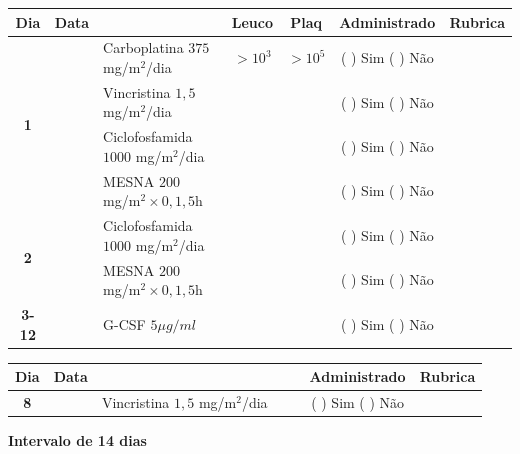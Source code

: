 \documentclass[11pt,a4paper,oldfontcommands]{memoir}
\begin{document}
\begin{center}
\begin{longtable}{p{1cm}c|p{5cm}|p{1.5cm}p{1.5cm}|c|c}
	\hline
	\multicolumn{1}{c|}{\multirow{1}{*}{\textbf{Dia}}}&{Data}&{}&\multicolumn{1}{c|}{Leuco}&\multicolumn{1}{c|}{Plaq}&{Administrado}&{Rubrica} \\
    \hline
    \multicolumn{1}{c|}{\multirow{4}{*}{\textbf{1}}}&\multirow{2}{*}{}&{Carboplatina 3\(75\) mg/m\(^2\)/dia}&\multicolumn{1}{c|}{\(>10^3\)}&\multicolumn{1}{c|}{\(>10^5\)}&{(  ) Sim (  ) Não}&\\
    \cline{4-5}
    \multicolumn{1}{c|}{}&&{Vincristina \(1,5\) mg/m\(^2\)/dia}&\multicolumn{1}{c|}{}&&{(  ) Sim (  ) Não}&\\
    \cline{4-5}
    \multicolumn{1}{c|}{}&\multirow{1}{*}{}&{Ciclofosfamida \(1000\) mg/m\(^2\)/dia}&{}&&{(  ) Sim (  ) Não}&\\
    \multicolumn{1}{c|}{}&&{MESNA \(200\) mg/m\(^2 \times 0,1,5\)h}&&&{(  ) Sim (  ) Não}&\\
    \cline{2-3}\cline{6-6}
    \multicolumn{1}{c|}{\multirow{2}{*}{\textbf{2}}}&\multirow{2}{*}{}&{Ciclofosfamida \(1000\) mg/m\(^2\)/dia}&{}&&{(  ) Sim (  ) Não}&\\
    \multicolumn{1}{c|}{}&&{MESNA \(200\) mg/m\(^2 \times 0,1,5\)h}&&&{(  ) Sim (  ) Não}&\\
    \hline
    \multicolumn{1}{c|}{\textbf{3-12}}&&{G-CSF \(5 \mu g/ml\) }&&&{(  ) Sim (  ) Não}&\\
    \hline
\end{longtable}
\begin{longtable}{p{1cm}c|p{4cm}|p{2cm}p{2cm}|c|c}
	\hline
	\multicolumn{1}{c|}{\multirow{1}{*}{\textbf{Dia}}}&{Data}&{}&{}&&{Administrado}&{Rubrica} \\
    \hline
    \multicolumn{1}{c|}{\textbf{8}}&&{Vincristina \(1,5\) mg/m\(^2\)/dia}&\multicolumn{1}{c}{}&&{(  ) Sim (  ) Não}&\\
    \hline
\end{longtable}
\textbf{Intervalo de 14 dias}


\end{center}
\end{document}
